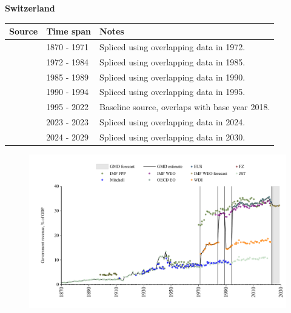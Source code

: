 \documentclass[12pt,a4paper,landscape]{article}
\begin{document}
\begin{adjustbox}{max totalsize={\paperwidth}{\paperheight},center}
\begin{minipage}[t][\textheight][t]{\textwidth}
\vspace*{0.5cm}
{}
\begin{center}
{\Large\bfseries Switzerland}
\end{center}
\vspace{0.5cm}
\begin{table}[H]
\centering
\small
\begin{tabular}{|l|l|l|}
\hline
\textbf{Source} & \textbf{Time span} & \textbf{Notes} \\
\hline
\rowcolor{white}\cite{JST}& 1870 - 1971 &Spliced using overlapping data in 1972.\\
\rowcolor{lightgray}\cite{WDI}& 1972 - 1984 &Spliced using overlapping data in 1985.\\
\rowcolor{white}\cite{IMF_WEO}& 1985 - 1989 &Spliced using overlapping data in 1990.\\
\rowcolor{lightgray}\cite{WDI}& 1990 - 1994 &Spliced using overlapping data in 1995.\\
\rowcolor{white}\cite{OECD_EO}& 1995 - 2022 &Baseline source, overlaps with base year 2018.\\
\rowcolor{lightgray}\cite{EUS}& 2023 - 2023 &Spliced using overlapping data in 2024.\\
\rowcolor{white}\cite{IMF_WEO_forecast}& 2024 - 2029 &Spliced using overlapping data in 2030.\\
\hline
\end{tabular}
\end{table}
\begin{figure}[H]
\centering
\includegraphics[width=\textwidth,height=0.6\textheight,keepaspectratio]{graphs/CHE_govrev_GDP.pdf}
\end{figure}
\end{minipage}
\end{adjustbox}
\end{document}
